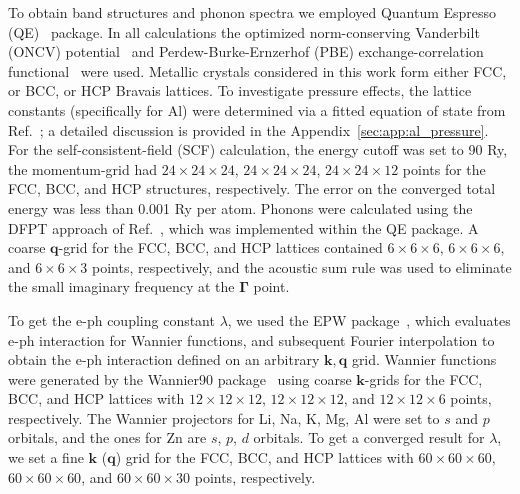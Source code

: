 \documentclass[%
 reprint,
superscriptaddress,
 amsmath,amssymb,
 aps,
prx,
]{revtex4-2}
\newcommand{\change}[2]{{\sout{#1} {\color{orange} {#2}}}}
\begin{document}
To obtain band structures and phonon spectra we employed Quantum Espresso (QE)~\cite{QE1,QE2,QE3} package. In all calculations the optimized norm-conserving Vanderbilt (ONCV) potential~\cite{ONCV1, ONCV2} and Perdew-Burke-Ernzerhof (PBE) exchange-correlation functional~\cite{perdew_generalized_1996} were used.
Metallic crystals considered in this work form either FCC, or BCC, or HCP Bravais lattices. 
{To investigate pressure effects, the lattice constants (specifically for Al) were determined via a fitted equation of state from Ref.~\cite{Al_EOS}; a detailed discussion is provided in the Appendix~\ref{sec:app:al_pressure}.}
For the self-consistent-field (SCF) calculation, 
the energy cutoff was set to 90 Ry, the momentum-grid had $24 \times 24 \times 24$, $24 \times 24 \times 24$, $24 \times 24 \times 12$ points  for the FCC, BCC, and HCP structures, respectively. The error on the converged total energy was less than 0.001 Ry per atom.
Phonons were calculated using the DFPT approach of Ref.~\cite{dfpt_rev}, which was implemented within the QE package.
A coarse $\mathbf{q}$-grid for the FCC, BCC, and HCP lattices
contained $6\times 6 \times 6$, $6\times 6 \times 6$, and $6\times 6 \times 3$ points, respectively, and the acoustic sum rule was used to eliminate the small imaginary frequency at the $\mathbf{\Gamma}$ point.

To get the e-ph coupling constant $\lambda$, we used the EPW package~\cite{EPW1, EPW2}, which evaluates e-ph interaction for
Wannier functions, and subsequent Fourier interpolation to obtain the
e-ph interaction defined on an arbitrary $\mathbf{k},\mathbf{q}$ grid. 
Wannier functions were generated by the Wannier90 package~\cite{Wann1, Wannier_Vanderbilt_1997, Wannier_Vanderbilt_2001} using coarse 
$\mathbf{k}$-grids for the FCC, BCC, and HCP lattices with $12\times 12 \times 12$, $12\times 12 \times 12$, and $12\times 12 \times 6$ points, respectively.
The Wannier projectors for  Li, Na, K, Mg, Al were set to $s$ and $p$ orbitals, and the ones for Zn are $s$, $p$, $d$ orbitals.
To get a converged result for $\lambda$, we set a fine $\mathbf{k}$ ($\mathbf{q}$) grid for the FCC, BCC, and HCP lattices with $60\times 60 \times 60$, $60\times 60 \times 60$, and  $60\times 60 \times 30$ points, respectively.
\end{document}
